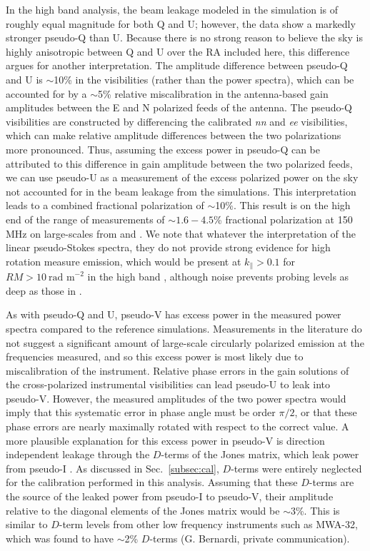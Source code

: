\documentclass[twocolumn, trackchanges]{aastex61}
\begin{document}
In the high band analysis, the beam leakage modeled in the simulation is of
roughly equal magnitude for both Q and U; however, the data show a markedly
stronger pseudo-Q than U. Because there is no strong reason to believe the sky
is highly anisotropic between Q and U over the RA included here, this difference
argues for another interpretation. The amplitude difference between pseudo-Q and
U is $\sim$10\% in the visibilities (rather than the power spectra), which can
be accounted for by a $\sim$5\% relative miscalibration in the antenna-based
gain amplitudes between the E and N polarized feeds of the antenna. The pseudo-Q
visibilities are constructed by differencing the calibrated \textit{nn} and
\textit{ee} visibilities, which can make relative amplitude differences between
the two polarizations more pronounced. Thus, assuming the excess power in
pseudo-Q can be attributed to this difference in gain amplitude between the two
polarized feeds, we can use pseudo-U as a measurement of the excess polarized
power on the sky not accounted for in the beam leakage from the
simulations. This interpretation leads to a combined fractional polarization of
$\sim$10\%. This result is on the high end of the range of measurements of
$\sim 1.6 - 4.5$\% fractional polarization at 150\,MHz on large-scales from
\cite{Jelic.15} and \cite{Lenc.16}.  We note that whatever the interpretation of
the linear pseudo-Stokes spectra, they do not provide strong evidence for high
rotation measure emission, which would be present at $k_\parallel > 0.1$ for
$RM > 10~\text{rad m}^{-2}$ in the high band \citep{Moore17}, although noise
prevents probing levels as deep as those in \cite{Asad18}.

As with pseudo-Q and U, pseudo-V has excess power in the measured power spectra
compared to the reference simulations. Measurements in the literature do not
suggest a significant amount of large-scale circularly polarized emission at the
frequencies measured, and so this excess power is most likely due to
miscalibration of the instrument. Relative phase errors in the gain solutions of
the cross-polarized instrumental visibilities can lead pseudo-U to leak into
pseudo-V. However, the measured amplitudes of the two power spectra would imply
that this systematic error in phase angle must be order $\pi/2$, or that these
phase errors are nearly maximally rotated with respect to the correct value. A
more plausible explanation for this excess power in pseudo-V is direction
independent leakage through the $D$-terms of the Jones matrix, which leak power
from pseudo-I \citep{TMS}. As discussed in Sec.~\ref{subsec:cal}, $D$-terms were
entirely neglected for the calibration performed in this analysis. Assuming that
these $D$-terms are the source of the leaked power from pseudo-I to pseudo-V,
their amplitude relative to the diagonal elements of the Jones matrix would be
$\sim$3\%. This is similar to $D$-term levels from other low frequency
instruments such as MWA-32, which was found to have $\sim$2\% $D$-terms
(G. Bernardi, private communication).
\end{document}
